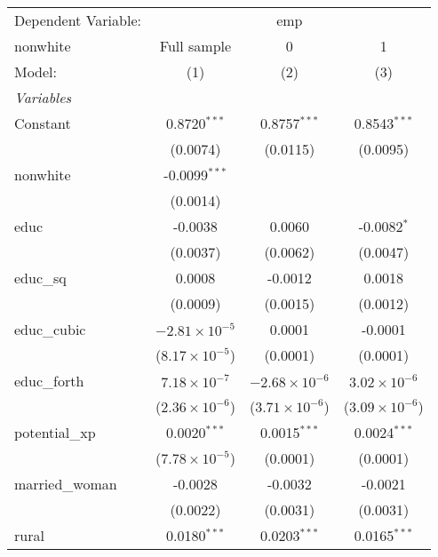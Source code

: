 \begingroup
\centering
\begin{tabular}{lccc}
   \tabularnewline \midrule \midrule
   Dependent Variable: & \multicolumn{3}{c}{emp}\\
   nonwhite        & Full sample             & 0                       & 1 \\   
   Model:          & (1)                     & (2)                     & (3)\\  
   \midrule
   \emph{Variables}\\
   Constant        & 0.8720$^{***}$          & 0.8757$^{***}$          & 0.8543$^{***}$\\   
                   & (0.0074)                & (0.0115)                & (0.0095)\\   
   nonwhite        & -0.0099$^{***}$         &                         &   \\   
                   & (0.0014)                &                         &   \\   
   educ            & -0.0038                 & 0.0060                  & -0.0082$^{*}$\\   
                   & (0.0037)                & (0.0062)                & (0.0047)\\   
   educ\_sq        & 0.0008                  & -0.0012                 & 0.0018\\   
                   & (0.0009)                & (0.0015)                & (0.0012)\\   
   educ\_cubic     & $-2.81\times 10^{-5}$   & 0.0001                  & -0.0001\\   
                   & ($8.17\times 10^{-5}$)  & (0.0001)                & (0.0001)\\   
   educ\_forth     & $7.18\times 10^{-7}$    & $-2.68\times 10^{-6}$   & $3.02\times 10^{-6}$\\    
                   & ($2.36\times 10^{-6}$)  & ($3.71\times 10^{-6}$)  & ($3.09\times 10^{-6}$)\\    
   potential\_xp   & 0.0020$^{***}$          & 0.0015$^{***}$          & 0.0024$^{***}$\\   
                   & ($7.78\times 10^{-5}$)  & (0.0001)                & (0.0001)\\   
   married\_woman  & -0.0028                 & -0.0032                 & -0.0021\\   
                   & (0.0022)                & (0.0031)                & (0.0031)\\   
   rural           & 0.0180$^{***}$          & 0.0203$^{***}$          & 0.0165$^{***}$\\   

\end{tabular}
